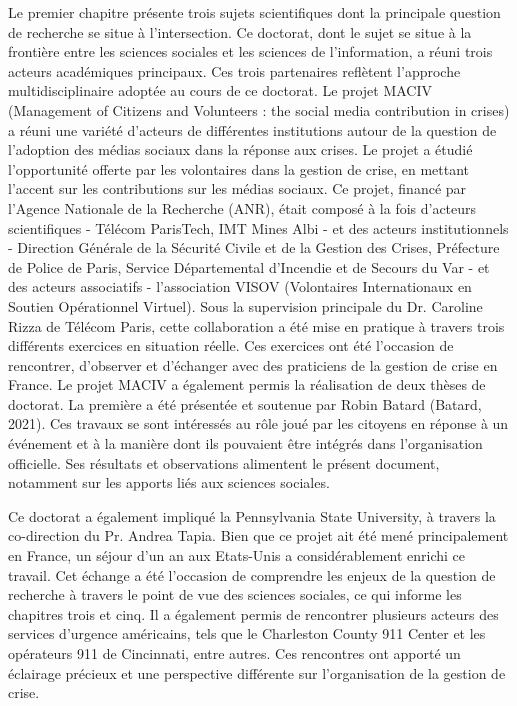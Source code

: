 Le premier chapitre présente trois sujets scientifiques dont la principale question de recherche se situe à l'intersection.
Ce doctorat, dont le sujet se situe à la frontière entre les sciences sociales et les sciences de l'information, a réuni trois acteurs académiques principaux.
Ces trois partenaires reflètent l'approche multidisciplinaire adoptée au cours de ce doctorat.
Le projet MACIV (Management of Citizens and Volunteers : the social media contribution in crises) a réuni une variété d'acteurs de différentes institutions autour de la question de l'adoption des médias sociaux dans la réponse aux crises.
Le projet a étudié l'opportunité offerte par les volontaires dans la gestion de crise, en mettant l'accent sur les contributions sur les médias sociaux.
Ce projet, financé par l'Agence Nationale de la Recherche (ANR), était composé à la fois d'acteurs scientifiques - Télécom ParisTech, IMT Mines Albi - et des acteurs institutionnels - Direction Générale de la Sécurité Civile et de la Gestion des Crises, Préfecture de Police de Paris, Service Départemental d'Incendie et de Secours du Var - et des acteurs associatifs - l'association VISOV (Volontaires Internationaux en Soutien Opérationnel Virtuel).
Sous la supervision principale du Dr. Caroline Rizza de Télécom Paris, cette collaboration a été mise en pratique à travers trois différents exercices en situation réelle.
Ces exercices ont été l'occasion de rencontrer, d'observer et d'échanger avec des praticiens de la gestion de crise en France.
Le projet MACIV a également permis la réalisation de deux thèses de doctorat.
La première a été présentée et soutenue par Robin Batard (Batard, 2021).
Ces travaux se sont intéressés au rôle joué par les citoyens en réponse à un événement et à la manière dont ils pouvaient être intégrés dans l'organisation officielle.
Ses résultats et observations alimentent le présent document, notamment sur les apports liés aux sciences sociales.

Ce doctorat a également impliqué la Pennsylvania State University, à travers la co-direction du Pr. Andrea Tapia. Bien que ce projet ait été mené principalement en France, un séjour d'un an aux Etats-Unis a considérablement enrichi ce travail. Cet échange a été l'occasion de comprendre les enjeux de la question de recherche à travers le point de vue des sciences sociales, ce qui informe les chapitres trois et cinq. Il a également permis de rencontrer plusieurs acteurs des services d'urgence américains, tels que le Charleston County 911 Center et les opérateurs 911 de Cincinnati, entre autres. Ces rencontres ont apporté un éclairage précieux et une perspective différente sur l'organisation de la gestion de crise.

